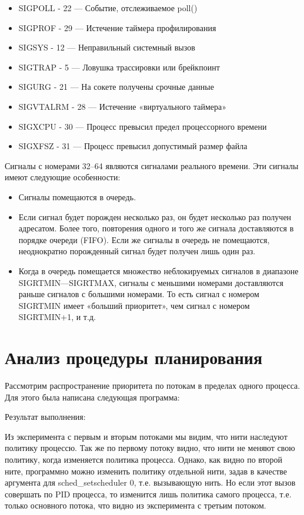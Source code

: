\documentclass[a4paper]{article}
\begin{document}
\begin{itemize}
		\item SIGPOLL - 22 --- Событие, отслеживаемое poll()
		\item SIGPROF - 29 --- Истечение таймера профилирования	
		\item SIGSYS - 12 --- Неправильный системный вызов
		\item SIGTRAP - 5 --- Ловушка трассировки или брейкпоинт
		\item SIGURG - 21 --- На сокете получены срочные данные
		\item SIGVTALRM - 28 --- Истечение «виртуального таймера»
		\item SIGXCPU - 30 --- Процесс превысил предел процессорного времени
		\item SIGXFSZ - 31 --- Процесс превысил допустимый размер файла
	\end{itemize}
	
	Сигналы с номерами 32--64 являются сигналами реального времени. Эти сигналы имеют следующие особенности:
	\begin{itemize}
		\item Сигналы помещаются в очередь.
		\item Если сигнал будет порожден несколько раз, он будет несколько раз получен адресатом. Более того, повторения одного и того же сигнала доставляются в порядке очереди (FIFO). Если же сигналы в очередь не помещаются, неоднократно порожденный сигнал будет получен лишь один раз.
		\item Когда в очередь помещается множество неблокируемых сигналов в диапазоне SIGRTMIN—SIGRTMAX, сигналы с меньшими номерами доставляются раньше сигналов с большими номерами. То есть сигнал с номером SIGRTMIN имеет «больший приоритет», чем сигнал с номером SIGRTMIN+1, и т.д.
	\end{itemize}

	\section{Анализ процедуры планирования}
	Рассмотрим распространение приоритета по потокам в пределах одного процесса. Для этого была написана следующая программа:
	
	Результат выполнения:
	
	Из эксперимента с первым и вторым потоками мы видим, что нити наследуют политику процессю. Так же по первому потоку видно, что нити не меняют свою политику, когда изменяется политика процесса. Однако, как видно по второй ните, программно можно изменить политику отдельной нити, задав в качестве аргумента для sched\_setscheduler 0, т.е. вызывающую нить. Но если этот вызов совершать по PID процесса, то изменится лишь политика самого процесса, т.е. только основного потока, что видно из эксперимента с третьим потоком.
\end{document}
